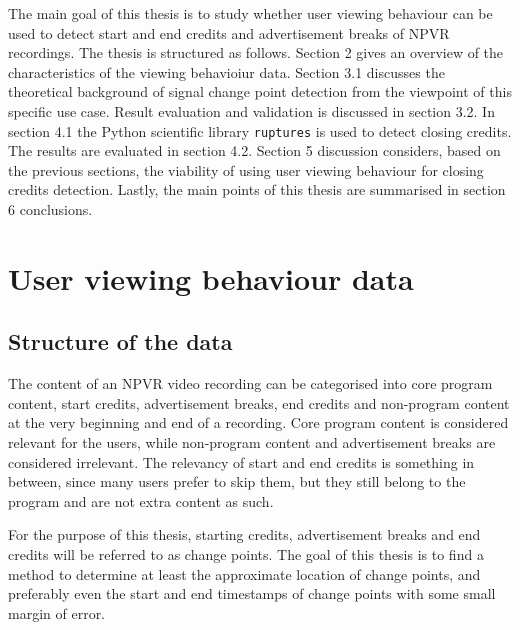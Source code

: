
The main goal of this thesis is to study whether user viewing behaviour can be used to detect start and end credits and advertisement breaks of NPVR recordings.
The thesis is structured as follows. Section 2 gives an overview of the characteristics of the viewing behavioiur data. Section 3.1 discusses the theoretical background of signal change point detection from the viewpoint of this specific use case. Result evaluation and validation is discussed in section 3.2. In section 4.1 the Python scientific library \texttt{ruptures} is used to detect closing credits. The results are evaluated in section 4.2. Section 5 discussion considers, based on the previous sections, the viability of using user viewing behaviour for closing credits detection. Lastly, the main points of this thesis are summarised in section 6 conclusions.

\section{User viewing behaviour data} \label{sec:data} %

\subsection{Structure of the data} \label{subsec:data}
The content of an NPVR video recording can be categorised into core program content, start credits, advertisement breaks, end credits and non-program content at the very beginning and end of a recording. Core program content is considered relevant for the users, while non-program content and advertisement breaks are considered irrelevant. The relevancy of start and end credits is something in between, since many users prefer to skip them, but they still belong to the program and are not extra content as such.

For the purpose of this thesis, starting credits, advertisement breaks and end credits will be referred to as change points. The goal of this thesis is to find a method to determine at least the approximate location of change points, and preferably even the start and end timestamps of change points with some small margin of error.

